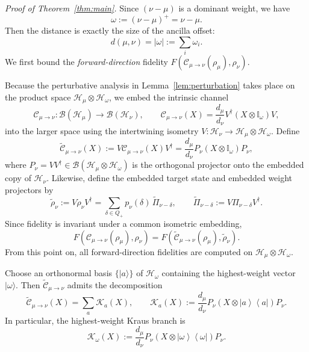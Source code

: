 \documentclass[a4paper,onecolumn,11pt]{quantumarticle}
\newcommand{\ket}[1]{| #1 \rangle}
\newcommand{\ketbra}[2]{\left|#1\right\rangle\!\!\left\langle #2\right|}
\def\h{\mathcal{H}}
\def\id{\mathbb{I}}
\def\C{\mathcal{C}}
\begin{document}
\emph{Proof of Theorem~\ref{thm:main}.}
Since \((\nu-\mu)\) is a dominant weight, we have
\[
\omega:= (\nu-\mu)^+=\nu-\mu.
\]
Then the distance is exactly the size of the ancilla offset:
\[
d(\mu,\nu)=|\omega|:=\sum_i\omega_i.
\]
We first bound the \emph{forward-direction} fidelity \(F(\C_{\mu\to\nu}(\rho_\mu),\rho_\nu)\).

Because the perturbative analysis in Lemma~\ref{lem:perturbation} takes place on the product space
\(\mathcal H_\mu\otimes \mathcal H_\omega\), we embed the intrinsic channel
\[
\C_{\mu\to\nu}:\mathcal B(\mathcal H_\mu)\to \mathcal B(\mathcal H_\nu),
\qquad
\C_{\mu\to\nu}(X)=\frac{d_\mu}{d_\nu}V^\dagger(X\otimes \id_\omega)V,
\]
into the larger space using the intertwining isometry \(V:\mathcal H_\nu\to \mathcal H_\mu\otimes \mathcal H_\omega\). Define
\begin{equation}\label{eq:embedded_channel}
    \widetilde{\C}_{\mu\to\nu}(X)
    :=
    V\C_{\mu\to\nu}(X)V^\dagger
    =
    \frac{d_\mu}{d_\nu}P_\nu(X\otimes \id_\omega)P_\nu ,
\end{equation}
where \(P_\nu=VV^\dagger\in\mathcal B(\h_\mu\otimes\h_\omega)\) is the orthogonal projector onto the embedded copy of \(\mathcal H_\nu\).
Likewise, define the embedded target state and embedded weight projectors by
\begin{equation}\label{eq:embedded_target}
    \widetilde{\rho}_\nu
    :=
    V\rho_\nu V^\dagger
    =
    \sum_{\delta\in Q_+} p_\nu(\delta)\,\widetilde{\Pi}_{\nu-\delta},
    \qquad
    \widetilde{\Pi}_{\nu-\delta}
    :=
    V\Pi_{\nu-\delta}V^\dagger .
\end{equation}
Since fidelity is invariant under a common isometric embedding,
\begin{equation}\label{eq:isometric_invariance_forward}
    F(\C_{\mu\to\nu}(\rho_\mu),\rho_\nu)
    =
    F(\widetilde{\C}_{\mu\to\nu}(\rho_\mu),\widetilde{\rho}_\nu).
\end{equation}
From this point on, all forward-direction fidelities are computed on
\(\mathcal H_\mu\otimes \mathcal H_\omega\).

Choose an orthonormal basis \(\{\ket{a}\}\) of \(\mathcal H_\omega\) containing the highest-weight vector \(\ket{\omega}\). Then \(\widetilde{\C}_{\mu\to\nu}\) admits the decomposition
\[
\widetilde{\C}_{\mu\to\nu}(X)=\sum_a \mathcal K_a(X),
\qquad
\mathcal K_a(X):=\frac{d_\mu}{d_\nu}P_\nu(X\otimes \ketbra{a}{a})P_\nu .
\]
In particular, the highest-weight Kraus branch is
\begin{equation}\label{eq:kraus_proj}
    \mathcal K_\omega(X)
    :=
    \frac{d_\mu}{d_\nu}P_\nu(X\otimes \ketbra{\omega}{\omega})P_\nu .
\end{equation}
\end{document}
